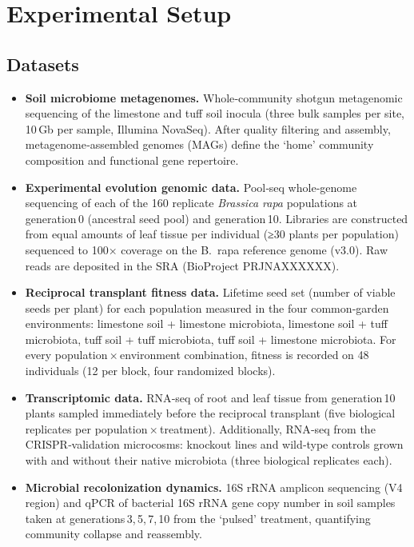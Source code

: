 \documentclass{article}
\begin{document}
\section{Experimental Setup}

\subsection{Datasets}
\begin{itemize}
  \item \textbf{Soil microbiome metagenomes.} Whole‑community shotgun metagenomic sequencing of the limestone and tuff soil inocula (three bulk samples per site, 10 Gb per sample, Illumina NovaSeq). After quality filtering and assembly, metagenome‑assembled genomes (MAGs) define the ‘home’ community composition and functional gene repertoire.
  \item \textbf{Experimental evolution genomic data.} Pool‑seq whole‑genome sequencing of each of the 160 replicate \textit{Brassica rapa} populations at generation 0 (ancestral seed pool) and generation 10. Libraries are constructed from equal amounts of leaf tissue per individual (≥30 plants per population) sequenced to 100× coverage on the B.~rapa reference genome (v3.0). Raw reads are deposited in the SRA (BioProject PRJNAXXXXXX).
  \item \textbf{Reciprocal transplant fitness data.} Lifetime seed set (number of viable seeds per plant) for each population measured in the four common‑garden environments: limestone soil + limestone microbiota, limestone soil + tuff microbiota, tuff soil + tuff microbiota, tuff soil + limestone microbiota. For every population × environment combination, fitness is recorded on 48 individuals (12 per block, four randomized blocks).
  \item \textbf{Transcriptomic data.} RNA‑seq of root and leaf tissue from generation 10 plants sampled immediately before the reciprocal transplant (five biological replicates per population × treatment). Additionally, RNA‑seq from the CRISPR‑validation microcosms: knockout lines and wild‑type controls grown with and without their native microbiota (three biological replicates each).
  \item \textbf{Microbial recolonization dynamics.} 16S rRNA amplicon sequencing (V4 region) and qPCR of bacterial 16S rRNA gene copy number in soil samples taken at generations 3, 5, 7, 10 from the ‘pulsed’ treatment, quantifying community collapse and reassembly.
\end{itemize}
\end{document}
